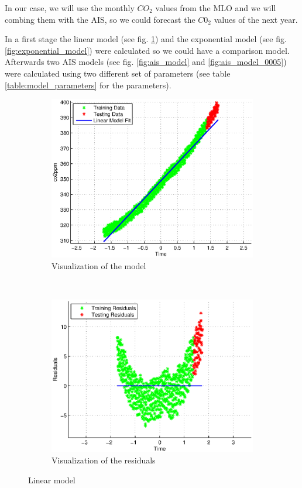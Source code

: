 \documentclass{assignment}
\begin{document}
In our case, we will use the monthly $CO_2$ values from the MLO and we will combing them with the AIS, so we could forecast the $C0_2$ values of the next year. 

In a first stage the linear model (see fig. \ref{fig:linear_model}) and the exponential model (see fig. \ref{fig:exponential_model}) were calculated so we could have a comparison model. Afterwards two AIS models (see fig. \ref{fig:ais_model} and \ref{fig:ais_model_0005}) were calculated using two different set of parameters (see table \ref{table:model_parameters} for the parameters).

\begin{figure}
  \centering
  \begin{subfigure}[b]{0.51\textwidth}
     \includegraphics[width=\textwidth]{images/linear_visualization.eps}
  \caption{Visualization of the model}
  \end{subfigure}%
   ~ %
  \begin{subfigure}[b]{0.51\textwidth}
    \includegraphics[width=\textwidth]{images/linear_residuals.eps}
  \caption{Visualization of the residuals}
  \end{subfigure}

  \caption{Linear model}
\label{fig:linear_model}
\end{figure}
\end{document}
